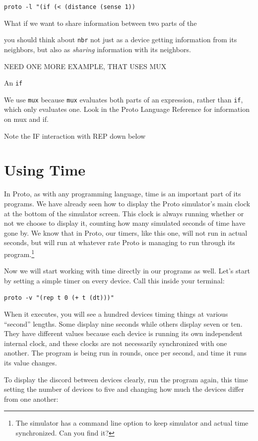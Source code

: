 \documentclass{article}
\newcommand\code[1]{\begin{center}\var{#1}\end{center}}
\newcommand\var[1]{{\tt #1}}
\begin{document}
\code{proto -l "(if (< (distance (sense 1))

What if we want to share information between two parts of the 

you should think about \var{nbr} not just as a device getting
information from its neighbors, but also as {\em sharing} information
with its neighbors.

NEED ONE MORE EXAMPLE, THAT USES MUX

An \var{if}

\label{s:mux}
We use \var{mux} because \var{mux} evaluates both
parts of an expression, rather than \var{if}, which only evaluates
one.  Look in the Proto Language Reference for information on mux and
if.
\TODO{}

Note the IF interaction with REP down below

\section{Using Time}

In Proto, as with any programming language, time is an important part
of its programs.  We have already seen how to display the Proto
simulator's main clock at the bottom of the simulator screen.  This
clock is always running whether or not we choose to display it,
counting how many simulated seconds of time have gone by.  We know
that in Proto, our timers, like this one, will not run in actual
seconds, but will run at whatever rate Proto is managing to run
through its program.\footnote{The simulator has a command line option
  to keep simulator and actual time synchronized.  Can you find it?}

Now we will start working with time directly in our programs as well.
Let's start by setting a simple timer on every device.  Call this
inside your terminal:

\code{proto -v "(rep t 0 (+ t (dt)))"}
	
When it executes, you will see a hundred devices timing things at
various ``second'' lengths.  Some display nine seconds while others
display seven or ten.  They have different values because each device
is running its own independent internal clock, and these clocks are
not necessarily synchronized with one another.  The program is being
run in rounds, once per second, and time it runs its value changes.

To display the discord between devices clearly, run the program again,
this time setting the number of devices to five and changing how much
the devices differ from one another:

}
\end{document}
